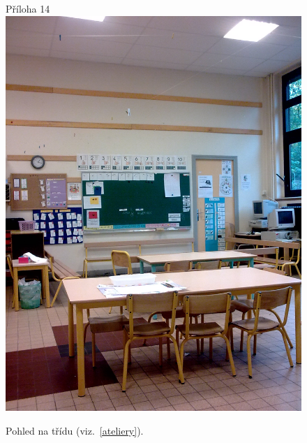 	\begin{figure}[tb]
		\centering
		Příloha 14\\
		\includegraphics[height=0.35\textheight]{./fotky/Obr14.jpg}
		\caption{
			Pohled na třídu (viz.~\ref{ateliery}).
		}
		\label{Obr14}
	\end{figure}

